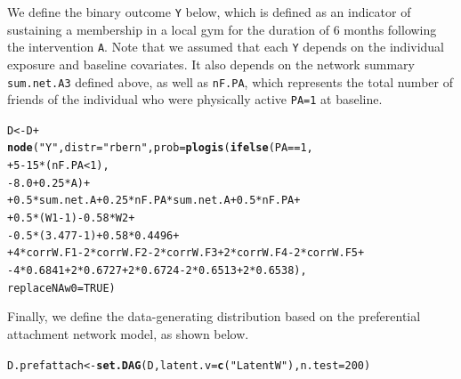 \documentclass[english]{article}\usepackage[]{graphicx}\usepackage[]{color}
\makeatletter
\newcommand{\hlnum}[1]{\textcolor[rgb]{0.686,0.059,0.569}{#1}}%
\newcommand{\hlstr}[1]{\textcolor[rgb]{0.192,0.494,0.8}{#1}}%
\newcommand{\hlopt}[1]{\textcolor[rgb]{0,0,0}{#1}}%
\newcommand{\hlstd}[1]{\textcolor[rgb]{0.345,0.345,0.345}{#1}}%
\newcommand{\hlkwb}[1]{\textcolor[rgb]{0.69,0.353,0.396}{#1}}%
\newcommand{\hlkwc}[1]{\textcolor[rgb]{0.333,0.667,0.333}{#1}}%
\newcommand{\hlkwd}[1]{\textcolor[rgb]{0.737,0.353,0.396}{\textbf{#1}}}%
\newenvironment{kframe}{%
 \def\at@end@of@kframe{}%
 \ifinner\ifhmode%
  \def\at@end@of@kframe{\end{minipage}}%
  \begin{minipage}{\columnwidth}%
 \fi\fi%
 \def\FrameCommand##1{\hskip\@totalleftmargin \hskip-\fboxsep
 \colorbox{shadecolor}{##1}\hskip-\fboxsep
     \hskip-\linewidth \hskip-\@totalleftmargin \hskip\columnwidth}%
 \MakeFramed {\advance\hsize-\width
   \@totalleftmargin\z@ \linewidth\hsize
   \@setminipage}}%
 {\par\unskip\endMakeFramed%
 \at@end@of@kframe}
\newenvironment{knitrout}{}{} %
\theoremstyle{plain}
\theoremstyle{plain}
\makeatother
\begin{document}
We define the binary outcome \texttt{Y} below, which is defined as an indicator of sustaining a membership in a local gym for the duration of 6 months following the intervention \texttt{A}. Note that we assumed that each \texttt{Y} depends on the individual exposure and baseline covariates. It also depends on the network summary \texttt{sum.net.A3} defined above, as well as \texttt{nF.PA}, which represents the total number of friends of the individual who were physically active \texttt{PA=1} at baseline.

\begin{knitrout}\footnotesize
{}\color{fgcolor}\begin{kframe}
\begin{alltt}
\hlstd{D} \hlkwb{<-} \hlstd{D} \hlopt{+}
  \hlkwd{node}\hlstd{(}\hlstr{"Y"}\hlstd{,} \hlkwc{distr} \hlstd{=} \hlstr{"rbern"}\hlstd{,} \hlkwc{prob} \hlstd{=} \hlkwd{plogis}\hlstd{(}\hlkwd{ifelse}\hlstd{(PA} \hlopt{==} \hlnum{1}\hlstd{,}
    \hlopt{+}\hlnum{5} \hlopt{-} \hlnum{15}\hlopt{*}\hlstd{(nF.PA} \hlopt{<} \hlnum{1}\hlstd{),}
    \hlopt{-}\hlnum{8.0} \hlopt{+} \hlnum{0.25}\hlopt{*}\hlstd{A)} \hlopt{+}
    \hlopt{+}\hlnum{0.5}\hlopt{*}\hlstd{sum.net.A} \hlopt{+} \hlnum{0.25}\hlopt{*}\hlstd{nF.PA}\hlopt{*}\hlstd{sum.net.A} \hlopt{+} \hlnum{0.5}\hlopt{*}\hlstd{nF.PA} \hlopt{+}
    \hlopt{+}\hlnum{0.5}\hlopt{*}\hlstd{(W1}\hlopt{-}\hlnum{1}\hlstd{)} \hlopt{-} \hlnum{0.58}\hlopt{*}\hlstd{W2} \hlopt{+}
    \hlopt{-}\hlnum{0.5}\hlopt{*}\hlstd{(}\hlnum{3.477}\hlopt{-}\hlnum{1}\hlstd{)} \hlopt{+} \hlnum{0.58}\hlopt{*}\hlnum{0.4496} \hlopt{+}
    \hlopt{+}\hlnum{4}\hlopt{*}\hlstd{corrW.F1} \hlopt{-}\hlnum{2}\hlopt{*}\hlstd{corrW.F2} \hlopt{-}\hlnum{2}\hlopt{*}\hlstd{corrW.F3} \hlopt{+}\hlnum{2}\hlopt{*}\hlstd{corrW.F4} \hlopt{-}\hlnum{2}\hlopt{*}\hlstd{corrW.F5} \hlopt{+}
    \hlopt{-}\hlnum{4}\hlopt{*}\hlnum{0.6841}   \hlopt{+}\hlnum{2}\hlopt{*}\hlnum{0.6727}   \hlopt{+}\hlnum{2}\hlopt{*}\hlnum{0.6724}   \hlopt{-}\hlnum{2}\hlopt{*}\hlnum{0.6513}   \hlopt{+}\hlnum{2}\hlopt{*}\hlnum{0.6538}\hlstd{),}
    \hlkwc{replaceNAw0} \hlstd{=} \hlnum{TRUE}\hlstd{)}
\end{alltt}
\end{kframe}
\end{knitrout}

Finally, we define the data-generating distribution based on the preferential attachment network model, as shown below.

\begin{knitrout}\footnotesize
{}\color{fgcolor}\begin{kframe}
\begin{alltt}
\hlstd{D.prefattach} \hlkwb{<-} \hlkwd{set.DAG}\hlstd{(D,} \hlkwc{latent.v} \hlstd{=} \hlkwd{c}\hlstd{(}\hlstr{"LatentW"}\hlstd{),} \hlkwc{n.test} \hlstd{=} \hlnum{200}\hlstd{)}
\end{alltt}
\end{kframe}
\end{knitrout}
\end{document}
